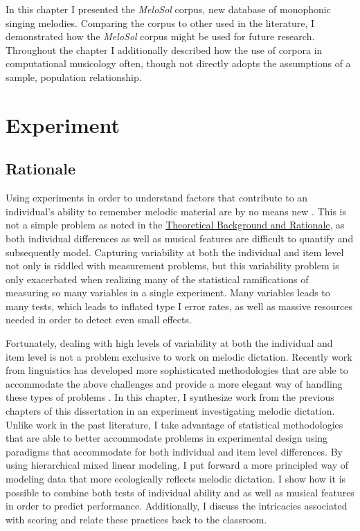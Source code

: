 \documentclass[]{book}
\begin{document}
In this chapter I presented the \emph{MeloSol} corpus, new database of monophonic singing melodies.
Comparing the corpus to other used in the literature, I demonstrated how the \emph{MeloSol} corpus might be used for future research.
Throughout the chapter I additionally described how the use of corpora in computational musicology often, though not directly adopts the assumptions of a sample, population relationship.

\hypertarget{experiment}{%
\chapter{Experiment}\label{experiment}}

\hypertarget{rationale-4}{%
\section{Rationale}\label{rationale-4}}

Using experiments in order to understand factors that contribute to an individual's ability to remember melodic material are by no means new \citep{ortmannTonalDeterminantsMelodic1933}.
This is not a simple problem as noted in the \protect\hyperlink{intro}{Theoretical Background and Rationale}, as both individual differences as well as musical features are difficult to quantify and subsequently model.
Capturing variability at both the individual and item level not only is riddled with measurement problems, but this variability problem is only exacerbated when realizing many of the statistical ramifications of measuring so many variables in a single experiment.
Many variables leads to many tests, which leads to inflated type I error rates, as well as massive resources needed in order to detect even small effects.

Fortunately, dealing with high levels of variability at both the individual and item level is not a problem exclusive to work on melodic dictation.
Recently work from linguistics has developed more sophisticated methodologies that are able to accommodate the above challenges and provide a more elegant way of handling these types of problems \citep{baayenMixedeffectsModelingCrossed2008}.
In this chapter, I synthesize work from the previous chapters of this dissertation in an experiment investigating melodic dictation.
Unlike work in the past literature, I take advantage of statistical methodologies that are able to better accommodate problems in experimental design using paradigms that accommodate for both individual and item level differences.
By using hierarchical mixed linear modeling, I put forward a more principled way of modeling data that more ecologically reflects melodic dictation.
I show how it is possible to combine both tests of individual ability and as well as musical features in order to predict performance.
Additionally, I discuss the intricacies associated with scoring and relate these practices back to the classroom.
\end{document}

